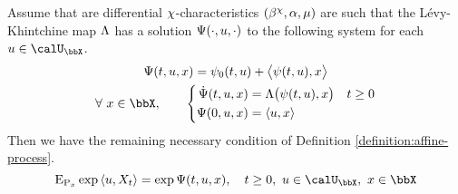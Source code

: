 \begin{proposition}
  \label{proposition:affine-resolution}
  Assume that are differential $\chi$-characteristics $(\beta^\chi, \alpha, \mu)$ are such that the L\'evy-Khintchine map $\Lambda$ has a solution $\Psi(\cdot, u, \cdot)$ to the following system for each $\momentVar \in \boundedSpace$.
  \begin{gather*}
    \aff(t, \momentVar, \stateVar) = \affPart_0(t, \momentVar) + \bprj{\affPart(t,\momentVar)}{\stateVar} \\
    \forall ~ \stateVar \in \stateSpace, \qquad \left\{\begin{aligned}
      \dot\aff(t, \momentVar, \stateVar) &= \ode\big(\affPart(t,\momentVar), \stateVar\big) & t \geq 0 \\
      \aff(0,\momentVar, \stateVar) &= \prj{\momentVar}{\stateVar}
    \end{aligned}\right.
  \end{gather*}
  Then we have the remaining necessary condition of Definition \ref{definition:affine-process}.
  \begin{equation*}
    \Exp_{\Prb_\stateVar}\exp\prj{\momentVar}{\X_t} = \exp\aff(t, \momentVar, \stateVar), \quad t \geq 0, ~ \momentVar \in\boundedSpace, ~ \stateVar \in \stateSpace
  \end{equation*}
\end{proposition}

